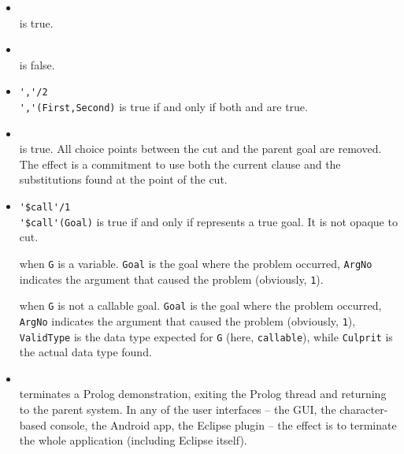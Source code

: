 \begin{itemize}

\item {}\\
    \noindent{} is true.

\item {}\\
    \noindent{} is false.

\item \verb|','/2|\\
    \noindent\verb|','(First,Second)| is true if and only if both 
    and  are true.

\item {}\\
    \noindent\bt{!} is true. All choice points between the cut and the
    parent goal are removed. The effect is a commitment to use both the
    current clause and the substitutions found at the point of the
    cut.

\item \verb|'$call'/1|\\
    \noindent\verb|'$call'(Goal)| is true if and only if 
    represents a true goal. It is not opaque to cut.


     when \texttt{G} is a variable. \texttt{Goal} is the goal where the problem occurred, \texttt{ArgNo} indicates the argument that caused the problem (obviously, \texttt{1}).

     when \texttt{G} is not a callable goal. \texttt{Goal} is the goal where the problem occurred, \texttt{ArgNo} indicates the argument that caused the problem (obviously, \texttt{1}), \texttt{ValidType} is the data type expected for \texttt{G} (here, \texttt{callable}), while \texttt{Culprit} is the actual data type found.

\item {}\\
    \noindent{} terminates a Prolog demonstration, exiting the
    Prolog thread and returning to the parent system. In any of the \tuprolog{} user interfaces -- the GUI, the character-based console, the Android app, the Eclipse plugin -- the effect is to terminate the whole application (including Eclipse itself).


\end{itemize}
